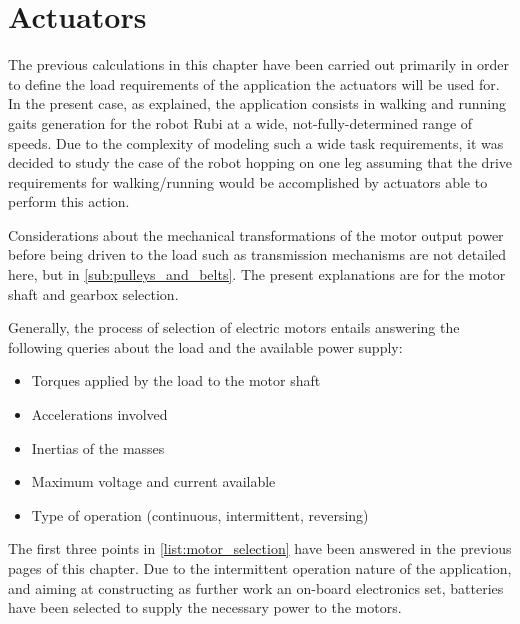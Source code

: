 
\section{Actuators}
\label{sec_actuators}
The previous calculations in this chapter have been carried out primarily in order to define the load requirements of the application the actuators will be used for.
In the present case, as explained, the application consists in walking and running gaits generation for the robot Rubi at a wide, not-fully-determined range of speeds. 
Due to the complexity of modeling such a wide task requirements, it was decided to study the case of the robot hopping on one leg assuming that the drive requirements for walking/running would be accomplished by actuators able to perform this action.

Considerations about the mechanical transformations of the motor output power before being driven to the load such as transmission mechanisms are not detailed here, but in \ref{sub:pulleys_and_belts}.
The present explanations are for the motor shaft and gearbox selection.

Generally, the process of selection of electric motors entails answering the following queries about the load and the available power supply:

\begin{itemize}
\label{list:motor_selection}
	\item Torques applied by the load to the motor shaft
	\item Accelerations involved
	\item Inertias of the masses 
	\item Maximum voltage and current available 
	\item Type of operation (continuous, intermittent, reversing)
\end{itemize}

The first three points in \ref{list:motor_selection} have been answered in the previous pages of this chapter.
Due to the intermittent operation nature of the application, and aiming at constructing as further work an on-board electronics set, batteries have been selected to supply the necessary power to the motors.
